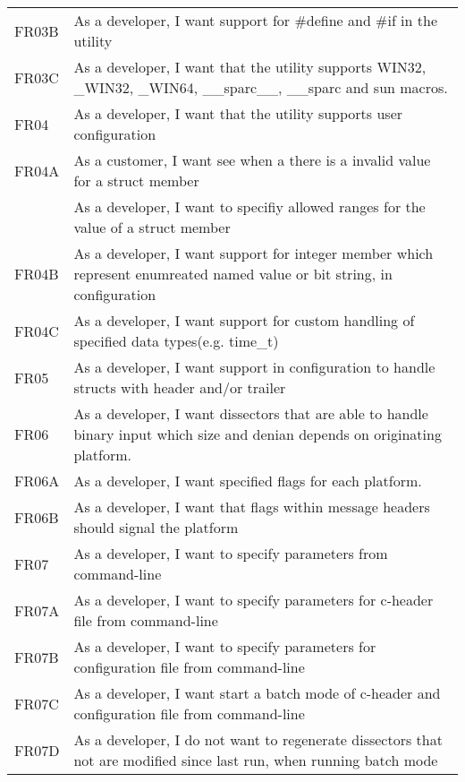 \begin{table}[ht]
{\begin{tabularx}{1.2\textwidth}{l X}
	FR03B	& As a developer, I want support for \#define and \#if in the utility\\
	FR03C	& As a developer, I want that the utility supports WIN32, \_WIN32, \_WIN64, \_\_sparc\_\_, \_\_sparc and sun macros.\\
	\addlinespace
	FR04 	& As a developer, I want that the utility supports user configuration\\
	FR04A 	& As a customer, I want see when a there is a invalid value for a struct member\\
			& As a developer, I want to specifiy allowed ranges for the value of a struct member\\
	FR04B	& As a developer, I want support for integer member which represent enumreated named value or bit string, in configuration\\
	FR04C	& As a developer, I want support for custom handling of specified data types(e.g. time\_t)\\
	\addlinespace
	FR05	& As a developer, I want support in configuration to handle structs with header and/or trailer\\
	\addlinespace
	FR06	& As a developer, I want dissectors that are able to handle binary input which size and denian depends on originating platform.\\
	FR06A	& As a developer, I want specified flags for each platform.\\
	FR06B	& As a developer, I want that flags within message headers should signal the platform\\
	\addlinespace
	FR07	& As a developer, I want to specify parameters from command-line\\
	FR07A	& As a developer, I want to specify parameters for c-header file from command-line\\
	FR07B	& As a developer, I want to specify parameters for configuration file from command-line\\
	FR07C	& As a developer, I want start a batch mode of c-header and configuration file from command-line\\
	FR07D	& As a developer, I do not want to regenerate dissectors that not are modified since last run, when running batch mode\\
	\bottomrule
\end{tabularx}}
\end{table}


